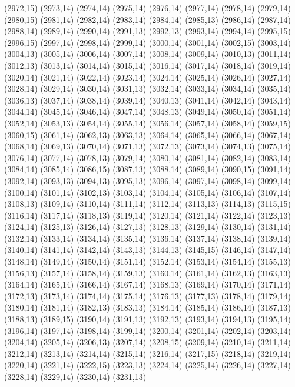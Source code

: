 (2972,15)
(2973,14)
(2974,14)
(2975,14)
(2976,14)
(2977,14)
(2978,14)
(2979,14)
(2980,15)
(2981,14)
(2982,14)
(2983,14)
(2984,14)
(2985,13)
(2986,14)
(2987,14)
(2988,14)
(2989,14)
(2990,14)
(2991,13)
(2992,13)
(2993,14)
(2994,14)
(2995,15)
(2996,15)
(2997,14)
(2998,14)
(2999,14)
(3000,14)
(3001,14)
(3002,15)
(3003,14)
(3004,13)
(3005,14)
(3006,14)
(3007,14)
(3008,14)
(3009,14)
(3010,13)
(3011,14)
(3012,13)
(3013,14)
(3014,14)
(3015,14)
(3016,14)
(3017,14)
(3018,14)
(3019,14)
(3020,14)
(3021,14)
(3022,14)
(3023,14)
(3024,14)
(3025,14)
(3026,14)
(3027,14)
(3028,14)
(3029,14)
(3030,14)
(3031,13)
(3032,14)
(3033,14)
(3034,14)
(3035,14)
(3036,13)
(3037,14)
(3038,14)
(3039,14)
(3040,13)
(3041,14)
(3042,14)
(3043,14)
(3044,14)
(3045,14)
(3046,14)
(3047,14)
(3048,13)
(3049,14)
(3050,14)
(3051,14)
(3052,14)
(3053,13)
(3054,14)
(3055,14)
(3056,14)
(3057,14)
(3058,14)
(3059,15)
(3060,15)
(3061,14)
(3062,13)
(3063,13)
(3064,14)
(3065,14)
(3066,14)
(3067,14)
(3068,14)
(3069,13)
(3070,14)
(3071,13)
(3072,13)
(3073,14)
(3074,13)
(3075,14)
(3076,14)
(3077,14)
(3078,13)
(3079,14)
(3080,14)
(3081,14)
(3082,14)
(3083,14)
(3084,14)
(3085,14)
(3086,15)
(3087,13)
(3088,14)
(3089,14)
(3090,15)
(3091,14)
(3092,14)
(3093,13)
(3094,13)
(3095,13)
(3096,14)
(3097,14)
(3098,14)
(3099,14)
(3100,14)
(3101,14)
(3102,13)
(3103,14)
(3104,14)
(3105,14)
(3106,14)
(3107,14)
(3108,13)
(3109,14)
(3110,14)
(3111,14)
(3112,14)
(3113,13)
(3114,13)
(3115,15)
(3116,14)
(3117,14)
(3118,13)
(3119,14)
(3120,14)
(3121,14)
(3122,14)
(3123,13)
(3124,14)
(3125,13)
(3126,14)
(3127,13)
(3128,13)
(3129,14)
(3130,14)
(3131,14)
(3132,14)
(3133,14)
(3134,14)
(3135,14)
(3136,14)
(3137,14)
(3138,14)
(3139,14)
(3140,14)
(3141,14)
(3142,14)
(3143,13)
(3144,13)
(3145,15)
(3146,14)
(3147,14)
(3148,14)
(3149,14)
(3150,14)
(3151,14)
(3152,14)
(3153,14)
(3154,14)
(3155,13)
(3156,13)
(3157,14)
(3158,14)
(3159,13)
(3160,14)
(3161,14)
(3162,13)
(3163,13)
(3164,14)
(3165,14)
(3166,14)
(3167,14)
(3168,13)
(3169,14)
(3170,14)
(3171,14)
(3172,13)
(3173,14)
(3174,14)
(3175,14)
(3176,13)
(3177,13)
(3178,14)
(3179,14)
(3180,14)
(3181,14)
(3182,13)
(3183,13)
(3184,14)
(3185,14)
(3186,14)
(3187,13)
(3188,13)
(3189,15)
(3190,14)
(3191,13)
(3192,13)
(3193,14)
(3194,13)
(3195,14)
(3196,14)
(3197,14)
(3198,14)
(3199,14)
(3200,14)
(3201,14)
(3202,14)
(3203,14)
(3204,14)
(3205,14)
(3206,13)
(3207,14)
(3208,15)
(3209,14)
(3210,14)
(3211,14)
(3212,14)
(3213,14)
(3214,14)
(3215,14)
(3216,14)
(3217,15)
(3218,14)
(3219,14)
(3220,14)
(3221,14)
(3222,15)
(3223,13)
(3224,14)
(3225,14)
(3226,14)
(3227,14)
(3228,14)
(3229,14)
(3230,14)
(3231,13)
